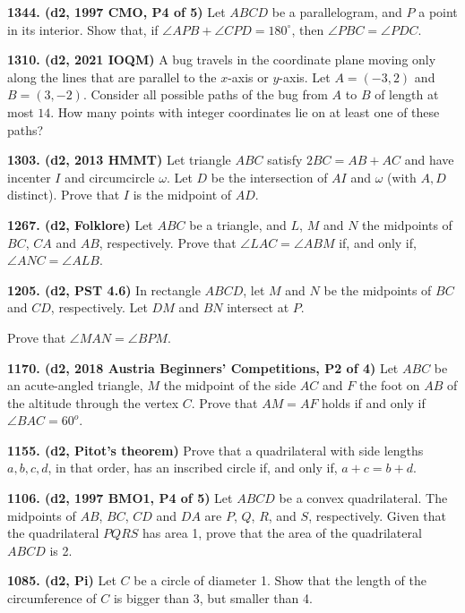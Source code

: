 \documentclass{article}
\begin{document}
\textbf{1344. (\color{red}d2\color{black}, 1997 CMO, P4 of 5)} Let $ABCD$ be a parallelogram, and $P$ a point in its interior. Show that, if $\angle APB + \angle CPD = 180^\circ$, then $\angle PBC = \angle PDC$.

\textbf{1310. (\color{red}d2\color{black}, 2021 IOQM)} A bug travels in the coordinate plane moving only along the lines that are parallel to the $x$-axis or $y$-axis. Let $A=(-3,2)$ and $B=(3,-2)$. Consider all possible paths of the bug from $A$ to $B$ of length at most $14$. How many points with integer coordinates lie on at least one of these paths?

\textbf{1303. (\color{red}d2\color{black}, 2013 HMMT)} Let triangle $ABC$ satisfy $2BC = AB + AC$ and have incenter $I$ and circumcircle $\omega$. Let $D$ be the intersection of $AI$ and $\omega$ (with $A, D$ distinct). Prove that $I$ is the midpoint of $AD$.

\textbf{1267. (\color{red}d2\color{black}, Folklore)} Let $ABC$ be a triangle, and $L$, $M$ and $N$ the midpoints of $BC$, $CA$ and $AB$, respectively. Prove that $\angle LAC = \angle ABM$ if, and only if, $\angle ANC = \angle ALB$.

\textbf{1205. (\color{red}d2\color{black}, PST 4.6)} In rectangle \(ABCD\), let \(M\) and \(N\) be the midpoints of \(BC\) and \(CD\), respectively.  Let \(DM\) and \(BN\) intersect at \(P\).

Prove that \(\angle MAN = \angle BPM\).

\textbf{1170. (\color{red}d2\color{black}, 2018 Austria Beginners' Competitions, P2 of 4)} Let $ABC$ be an acute-angled triangle, $M$ the midpoint of the side $AC$ and $F$ the foot on $AB$ of the altitude through the vertex $C$. Prove that $AM = AF$ holds if and only if $\angle BAC = 60^o$.

\textbf{1155. (\color{red}d2\color{black}, Pitot's theorem)} Prove that a quadrilateral with side lengths $a, b, c, d$, in that order, has an inscribed circle if, and only if, $a + c = b + d$.

\textbf{1106. (\color{red}d2\color{black}, 1997 BMO1, P4 of 5)} Let $ABCD$ be a convex quadrilateral. The midpoints of $AB$, $BC$, $CD$ and $DA$ are $P$, $Q$, $R$, and $S$, respectively. Given that the quadrilateral $PQRS$ has area 1, prove that the area of the quadrilateral $ABCD$ is 2.

\textbf{1085. (\color{red}d2\color{black}, Pi)} Let $C$ be a circle of diameter 1. Show that the length of the circumference of $C$ is bigger than 3, but smaller than 4.
\end{document}
